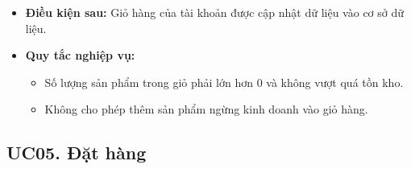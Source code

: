 \documentclass[12pt,a4paper]{article}
\begin{document}
\begin{itemize}
 \item \textbf{Điều kiện sau:} Giỏ hàng của tài khoản được cập nhật dữ liệu vào cơ sở dữ liệu.

 \item \textbf{Quy tắc nghiệp vụ:}
 \begin{itemize}
  \item Số lượng sản phẩm trong giỏ phải lớn hơn 0 và không vượt quá tồn kho.
  \item Không cho phép thêm sản phẩm ngừng kinh doanh vào giỏ hàng.
 \end{itemize}

\end{itemize}


\subsection{UC05. Đặt hàng}
\end{document}
